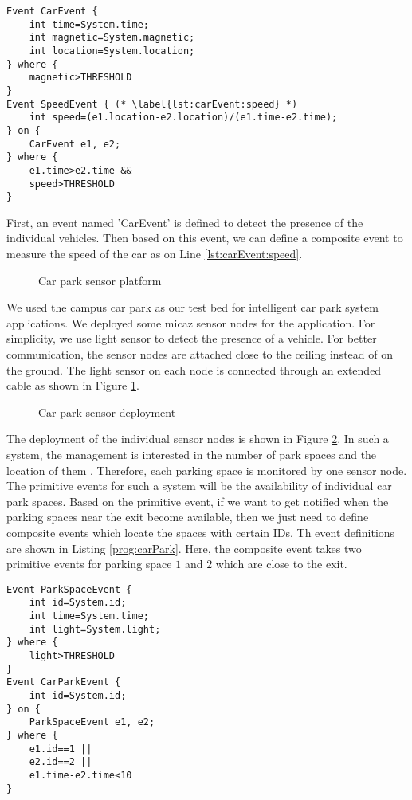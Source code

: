 \begin{lstlisting}[caption=Event definition for tracking vehicles, label=lst:carEvent]
Event CarEvent {
	int time=System.time;
	int magnetic=System.magnetic;
	int location=System.location;
} where {
	magnetic>THRESHOLD
}
Event SpeedEvent { (* \label{lst:carEvent:speed} *)
	int speed=(e1.location-e2.location)/(e1.time-e2.time);
} on {
	CarEvent e1, e2;
} where {
	e1.time>e2.time &&
	speed>THRESHOLD
}
\end{lstlisting}

First, an event named 'CarEvent' is defined to detect the presence of the individual vehicles. Then based on this event, we can define a composite event to measure the speed of the car as on Line \ref{lst:carEvent:speed}.

\begin{figure}
\centering
{}
\caption{Car park sensor platform}
\label{fig:carParkSensor}
\end{figure}

We used the campus car park as our test bed for intelligent car park system applications. We deployed some micaz sensor nodes for the application. For simplicity, we use light sensor to detect the presence of a vehicle. For better communication, the sensor nodes are attached close to the ceiling instead of on the ground. The light sensor on each node is connected through an extended cable as shown in Figure \ref{fig:carParkSensor}. 

\begin{figure}
\centering
{}
\caption{Car park sensor deployment}
\label{fig:carParkDeployment}
\end{figure}

The deployment of the individual sensor nodes is shown in Figure \ref{fig:carParkDeployment}. In such a system, the management is interested in the number of park spaces and the location of them \cite{tang:carpark}. Therefore, each parking space is monitored by one sensor node.
The primitive events for such a system will be the availability of individual car park spaces. Based on the primitive event, if we want to get notified when the parking spaces near the exit become available, then we just need to define composite events which locate the spaces with certain IDs. Th event definitions are shown in Listing \ref{prog:carPark}. Here, the composite event takes two primitive events for parking space \(1\) and \(2\) which are close to the exit.

\begin{lstlisting}[caption=Event definition for a car park, label=prog:carPark]
Event ParkSpaceEvent {
	int id=System.id;
	int time=System.time;
	int light=System.light;
} where {
	light>THRESHOLD
}
Event CarParkEvent {
	int id=System.id;
} on {
	ParkSpaceEvent e1, e2;
} where {
	e1.id==1 ||
	e2.id==2 ||
	e1.time-e2.time<10
}\end{lstlisting}